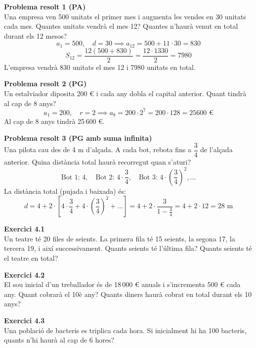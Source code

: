 \documentclass[12pt]{article}
\begin{document}
\begin{exemple}
\textbf{Problema resolt 1 (PA)}\\
Una empresa ven 500 unitats el primer mes i augmenta les vendes en 30 unitats cada mes. Quantes unitats vendrà el mes 12? Quantes n'haurà venut en total durant els 12 mesos?
\[
a_1 = 500, \quad d = 30 \implies a_{12} = 500 + 11 \cdot 30 = 830
\]
\[
S_{12} = \dfrac{12(500 + 830)}{2} = \dfrac{12 \cdot 1330}{2} = 7980
\]
L'empresa vendrà 830 unitats el mes 12 i 7980 unitats en total.
\end{exemple}

\begin{exemple}
\textbf{Problema resolt 2 (PG)}\\
Un estalviador diposita 200 € i cada any dobla el capital anterior. Quant tindrà al cap de 8 anys?
\[
a_1 = 200, \quad r = 2 \implies a_8 = 200 \cdot 2^7 = 200 \cdot 128 = 25600 \text{ €}
\]
Al cap de 8 anys tindrà 25\,600 €.
\end{exemple}

\begin{exemple}
\textbf{Problema resolt 3 (PG amb suma infinita)}\\
Una pilota cau des de 4 m d'alçada. A cada bot, rebota fins a $\dfrac{3}{4}$ de l'alçada anterior. Quina distància total haurà recorregut quan s'aturi?
\[
\text{Bot 1: } 4, \quad \text{Bot 2: } 4 \cdot \dfrac{3}{4}, \quad \text{Bot 3: } 4 \cdot \left(\dfrac{3}{4}\right)^2, \dots
\]
La distància total (pujada i baixada) és:
\[
d = 4 + 2 \cdot \left[ 4 \cdot \dfrac{3}{4} + 4 \cdot \left(\dfrac{3}{4}\right)^2 + \dots \right] = 4 + 2 \cdot \dfrac{3}{1 - \frac{3}{4}} = 4 + 2 \cdot 12 = 28 \text{ m}
\]
\end{exemple}

\begin{exercici}
\textbf{Exercici 4.1}\\
Un teatre té 20 files de seients. La primera fila té 15 seients, la segona 17, la tercera 19, i així successivament. Quants seients té l'última fila? Quants seients té el teatre en total?
\end{exercici}

\begin{exercici}
\textbf{Exercici 4.2}\\
El sou inicial d'un treballador és de 18\,000 € anuals i s'incrementa 500 € cada any. Quant cobrarà el 10è any? Quants diners haurà cobrat en total durant els 10 anys?
\end{exercici}

\begin{exercici}
\textbf{Exercici 4.3}\\
Una població de bacteris es triplica cada hora. Si inicialment hi ha 100 bacteris, quants n'hi haurà al cap de 6 hores?
\end{exercici}
\end{document}
